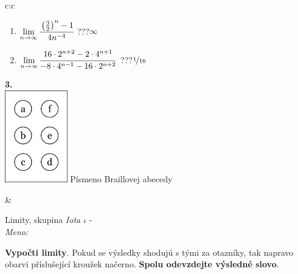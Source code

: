 \documentclass[10pt]{report}
\begin{document}
\begin{tabular}{c:c}
\begin{minipage}[c][104.5mm][t]{0.5\linewidth}
\begin{center}
\begin{minipage}{0.79\linewidth}
\begin{center}
\begin{varwidth}{\linewidth}
\begin{enumerate}
\item $\lim\limits_{n\to\infty}\cfrac{\left(\frac{3}{2}\right)^n -1}{4n^{-4}}$\quad \dotfill\; ???\;\dotfill \quad $\infty$
\item $\lim\limits_{n\to\infty}\cfrac{16\cdot 2^{n+2}-2\cdot 4^{n+1}}{-8\cdot 4^{n-1}-16\cdot 2^{n+2}}$\quad \dotfill\; ???\;\dotfill \quad $\nicefrac{1}{16}$
\end{enumerate}
\end{varwidth}
\end{center}
\end{minipage}
\begin{minipage}{0.20\linewidth}
\begin{center}
{\Huge\bfseries 3.} \\[2mm]
\includegraphics[height=40mm]{../images/braille.png}
{\small Písmeno Braillovej abecedy}
\end{center}
\end{minipage}
\end{center}
\end{minipage}
&
\begin{minipage}[c][104.5mm][t]{0.5\linewidth}
\begin{center}
\vspace{7mm}
{\huge Limity, skupina \textit{Iota $\iota$} -}\\[5mm]
\textit{Meno:}\phantom{xxxxxxxxxxxxxxxxxxxxxxxxxxxxxxxxxxxxxxxxxxxxxxxxxxxxxxxxxxxxxxxxx}\\[5mm]
\begin{minipage}{0.95\linewidth}
\begin{center}
\textbf{Vypočti limity}. Pokud se výsledky shodujú s tými za otazníky, tak napravo\\obarvi příslušející kroužek načerno. \textbf{Spolu odevzdejte výsledné slovo}.
\end{center}
\end{minipage}
\\[1mm]
\begin{minipage}{0.79\linewidth}
\begin{center}
\begin{varwidth}{\linewidth}

\end{varwidth}
\end{center}
\end{minipage}
\end{center}
\end{minipage}
\end{tabular}
\end{document}
